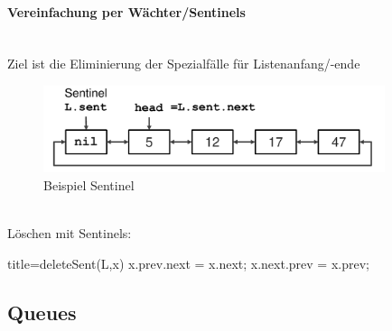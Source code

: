 \documentclass[
    ngerman,
    color=3b,
    load_common, %
    summary,
    boxarc,
]{tuda_summary}
\begin{document}
\paragraph{Vereinfachung per Wächter/Sentinels}\mbox{}\\
Ziel ist die Eliminierung der Spezialfälle für Listenanfang/-ende
\begin{figure}[h]
    \centering
    \includegraphics[width=10cm]{pictures/linkedListSentinel.pdf}
    \caption{Beispiel Sentinel}
\end{figure}\mbox{}\\
Löschen mit Sentinels:
%
\begin{codeBlock}[autogobble]{title={deleteSent(L,x)}}
    x.prev.next = x.next;
    x.next.prev = x.prev;
\end{codeBlock}
\clearpage
\subsection{Queues}\label{Queues}
\end{document}

